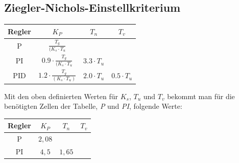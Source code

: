 \documentclass{article}
\begin{document}
		\subsection{Ziegler-Nichols-Einstellkriterium}
			\begin{center}
				\begin{tabular}{ c || c | c | c }
					 Regler & $K_P$ & $T_n$ & $T_v$ \\ 
					 \hline\hline
					 P & $\frac{T_g}{(K_s \cdot T_u}$ &  &  \\  
					 \hline
					 PI & $0.9 \cdot \frac{T_g}{(K_s \cdot T_u}$ & $3.3 \cdot T_u$ &    \\
					 \hline
					 PID & $1.2 \cdot \frac{T_g}{(K_s \cdot T_u)}$ & $2.0 \cdot T_u$ & $0.5 \cdot T_u$
				\end{tabular}
			\end{center}
\vspace{3mm}
			Mit den oben definierten Werten für $K_s$, $T_u$ und $T_v$ bekommt man für die benötigten Zellen der Tabelle, \textit{P} und \textit{PI}, folgende Werte:
\vspace{3mm}
			\begin{center}
				\begin{tabular}{ c || c | c | c }
					 Regler & $K_P$ & $T_n$ & $T_v$ \\ 
					 \hline\hline
					 P & $2,08$ &  &  \\  
					 \hline
					 PI & $4,5$ & $1,65$ & 
				\end{tabular}
			\end{center}
\newpage
\end{document}
